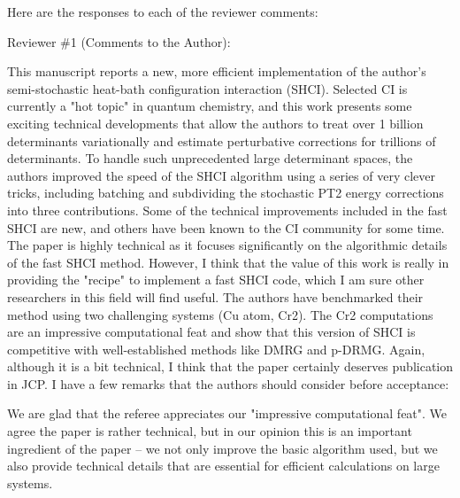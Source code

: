\documentclass[
reprint,
 superscriptaddress,
 amsmath,amssymb,
 aps,
]{revtex4-1}
\begin{document}

Here are the responses to each of the reviewer comments:

{\color{blue}
Reviewer \#1 (Comments to the Author):

This manuscript reports a new, more efficient implementation of the author's semi-stochastic heat-bath configuration interaction (SHCI). Selected CI is currently a "hot topic" in quantum chemistry, and this work presents some exciting technical developments that allow the authors to treat over 1 billion determinants variationally and estimate perturbative corrections for trillions of determinants. To handle such unprecedented large determinant spaces, the authors improved the speed of the SHCI algorithm using a series of very clever tricks, including batching and subdividing the stochastic PT2 energy corrections into three contributions. Some of the technical improvements included in the fast SHCI are new, and others have been known to the CI community for some time. The paper is highly technical as it focuses significantly on the algorithmic details of the fast SHCI method. However, I think that the value of this work is really in providing the "recipe" to implement a fast SHCI code, which I am sure other researchers in this field will find useful. The authors have benchmarked their method using two challenging systems (Cu atom, Cr2). The Cr2 computations are an impressive computational feat and show that this version of SHCI is competitive with well-established methods like DMRG and p-DRMG. Again, although it is a bit technical, I think that the paper certainly deserves publication in JCP. I have a few remarks that the authors should consider before acceptance:
}\color{black}

We are glad that the referee appreciates our "impressive computational feat".  We agree the paper is rather technical, but in our opinion
this is an important ingredient of the paper -- we not only improve the basic algorithm used, but we also provide technical details that
are essential for efficient calculations on large systems.
\end{document}
